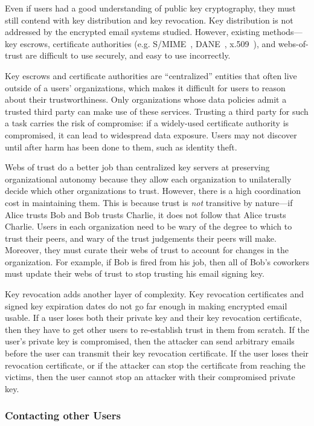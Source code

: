Even if users had a good understanding of public key cryptography, they must still contend
with key distribution and key revocation.  Key distribution is not addressed by
the encrypted email systems studied.  However, existing methods---key escrows,
certificate authorities (e.g. S/MIME~\cite{smime}, DANE~\cite{dane},
x.509~\cite{x509}), and webs-of-trust are difficult to use securely, and easy to
use incorrectly.

Key escrows and certificate authorities are ``centralized''
entities that often live outside of a users' organizations, which makes it
difficult for users to reason about their trustworthiness.  Only organizations
whose data policies admit a trusted third party can make use of these services.
Trusting a third party for such a task carries the risk of compromise: if a
widely-used certificate authority is compromised, it can lead to widespread
data exposure.  Users may not discover until after harm has been done to
them, such as identity theft.

Webs of trust do a better job than centralized key servers at preserving
organizational autonomy because they allow each organization to unilaterally
decide which other organizations to trust.  However, there is a high
coordination cost in maintaining them.  This
is because trust is \emph{not} transitive by nature---if Alice trusts Bob and Bob
trusts Charlie, it does not follow that Alice trusts Charlie.  Users in each
organization need to be wary of the degree to which to trust their peers, and wary of the trust
judgements their peers will make.  Moreover, they must curate their webs of
trust to account for changes in the organization.  For example, if Bob is fired
from his job, then all of Bob's coworkers must update their webs of trust to stop trusting his
email signing key.

Key revocation adds another layer of complexity.  Key revocation certificates
and signed key expiration dates do not go far enough in making encrypted email
usable.  If a user loses both their private key and their key revocation
certificate, then they have to get other users to re-establish trust in them
from scratch.  If the user's private key is compromised, then the attacker can
send arbitrary emails before the user can transmit their key revocation
certificate.  If the user loses their revocation certificate, or if the attacker
can stop the certificate from reaching the victims, then the user cannot stop an
attacker with their compromised private key.

\subsubsection{Contacting other Users}

